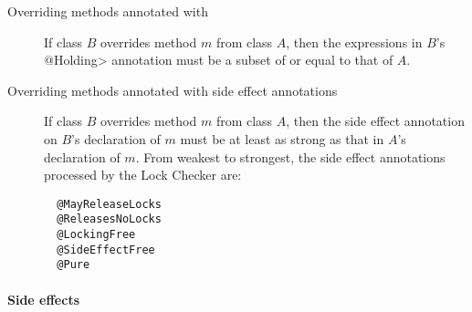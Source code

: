 \begin{description}

\item[Overriding methods annotated with ]
  If class $B$ overrides method $m$ from class $A$, then the expressions in
  $B$'s \<@Holding>
  annotation must be a subset of or equal to that of $A$.

\item[Overriding methods annotated with side effect annotations]
  If class $B$ overrides method $m$ from class $A$, then
  the side effect annotation on $B$'s declaration of $m$
  must be at least as strong as that in $A$'s declaration of $m$.
  From weakest to strongest, the side effect annotations
  processed by the Lock Checker are:
\begin{verbatim}
  @MayReleaseLocks
  @ReleasesNoLocks
  @LockingFree
  @SideEffectFree
  @Pure
\end{verbatim}

\end{description}

\paragraph{Side effects}

